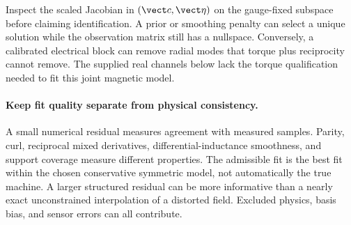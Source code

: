 Inspect the scaled Jacobian in $(\vect c,\vect\eta)$ on the gauge-fixed
subspace before claiming identification. A prior or smoothing penalty can
select a unique solution while the observation matrix still has a nullspace.
Conversely, a calibrated electrical block can remove radial modes that
torque plus reciprocity cannot remove. The supplied real channels below lack
the torque qualification needed to fit this joint magnetic model.

\paragraph{Keep fit quality separate from physical consistency.}
A small numerical residual measures agreement with measured samples. Parity,
curl, reciprocal mixed derivatives, differential-inductance smoothness, and
support coverage measure different properties. The admissible fit is the
best fit within the chosen conservative symmetric model, not automatically
the true machine. A larger structured residual can be more informative than
a nearly exact unconstrained interpolation of a distorted field. Excluded
physics, basis bias, and sensor errors can all contribute.
